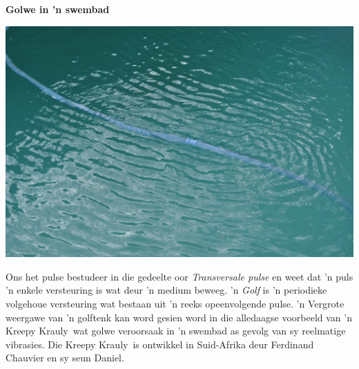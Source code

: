             \nopagebreak
\begin{minipage}{.5\textwidth}
\textbf{Golwe in  'n swembad}\par
 \includegraphics[width=.8\textwidth]{photos/kreepykrawly.jpg}
\end{minipage}
\begin{minipage}{.5\textwidth}  
Ons het pulse bestudeer in die gedeelte oor \textit{Transversale pulse} en weet dat   'n puls   'n enkele versteuring is wat deur   'n medium beweeg. 'n \textsl{Golf} is 'n periodieke volgehoue versteuring wat bestaan uit   'n reeks opeenvolgende pulse.  'n Vergrote weergawe van   'n golftenk kan word  gesien word in die alledaagse voorbeeld van  'n Kreepy Krauly\textregistered\ wat golwe veroorsaak in   'n swembad as gevolg van sy reelmatige vibrasies. Die Kreepy Krauly\textregistered\ is ontwikkel in Suid-Afrika deur Ferdinand Chauvier en sy seun Daniel.\\
\end{minipage}
